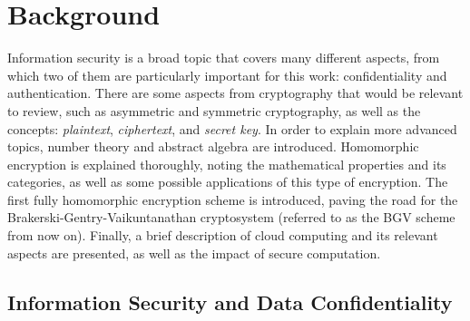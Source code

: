 \chapter{Background}
\label{background}

Information security is a broad topic that covers many different aspects, from which two of them are particularly important for this work: confidentiality and authentication. There are some aspects from cryptography that would be relevant to review, such as asymmetric and symmetric cryptography, as well as the concepts: \emph{plaintext}, \emph{ciphertext}, and \emph{secret key}. In order to explain more advanced topics, number theory and abstract algebra are introduced. Homomorphic encryption is explained thoroughly, noting the mathematical properties and its categories, as well as some possible applications of this type of encryption. The first fully homomorphic encryption scheme is introduced, paving the road for the Brakerski-Gentry-Vaikuntanathan cryptosystem (referred to as the BGV scheme from now on). Finally, a brief description of cloud computing and its relevant aspects are presented, as well as the impact of secure computation.

\section{Information Security and Data Confidentiality}

